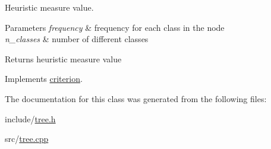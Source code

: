 Heuristic measure value. 


\begin{DoxyParams}{Parameters}
{\em frequency} & frequency for each class in the node \\
\hline
{\em n\+\_\+classes} & number of different classes\\
\hline
\end{DoxyParams}
\begin{DoxyReturn}{Returns}
heuristic measure value 
\end{DoxyReturn}


Implements \hyperlink{classcriterion_a1fbda0723578acd5ac612248a54ba71d}{criterion}.



The documentation for this class was generated from the following files\+:\begin{DoxyCompactItemize}
\item 
include/\hyperlink{tree_8h}{tree.\+h}\item 
src/\hyperlink{tree_8cpp}{tree.\+cpp}\end{DoxyCompactItemize}
